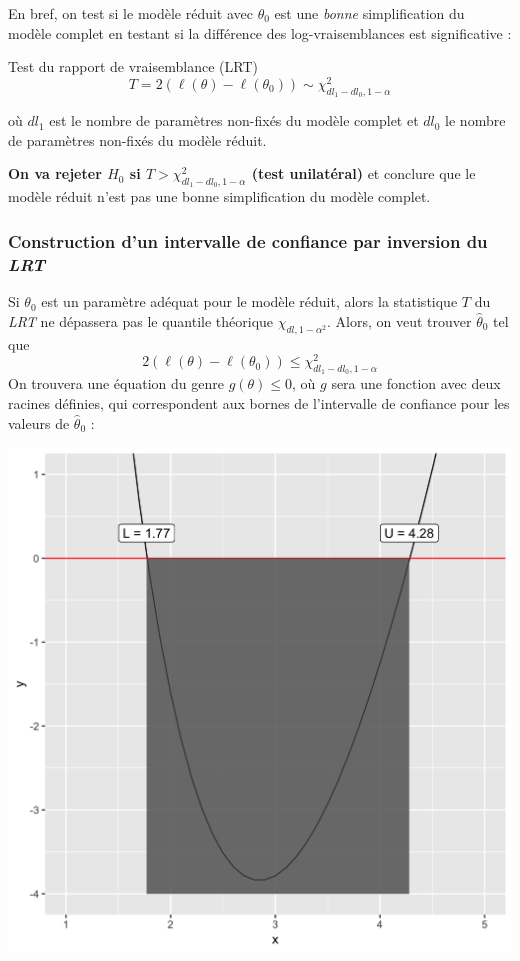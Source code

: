 \documentclass[10pt, french]{article}
\begin{document}
\begin{multicols*}{3}
En bref, on test si le modèle réduit avec $\theta_0$ est une \emph{bonne} simplification du modèle complet en testant si la différence des log-vraisemblances est significative : 
\begin{algo}{Test du rapport de vraisemblance (LRT)}
\[
	T 
	= 		2 \left( \ell(\theta) - \ell(\theta_0) \right)
	\sim		\chi_{dl_1 - dl_0, 1 - \alpha}^2
\]
\end{algo}
où $dl_1$ est le nombre de paramètres non-fixés du modèle complet et $dl_0$ le nombre de paramètres non-fixés du modèle réduit. 

\textbf{On va rejeter $H_0$ si $T >\chi_{dl_1 - dl_0, 1-\alpha}^2 $ (test unilatéral)} et conclure que le modèle réduit n'est pas une bonne simplification du modèle complet.

\subsubsection*{Construction d'un intervalle de confiance par inversion du \emph{LRT}}
Si $\theta_0$ est un paramètre adéquat pour le modèle réduit, alors la statistique $T$ du \emph{LRT} ne dépassera pas le quantile théorique $\chi_{dl, 1- \alpha^2}$. 
Alors, on veut trouver $\hat{\theta}_0$ tel que
\[2 \left( \ell(\theta) - \ell(\theta_0) \right) \leq  \chi_{dl_1 - dl_0, 1-\alpha}^2\]
On trouvera une équation du genre $g(\theta) \leq 0$, où $g$ sera une fonction avec deux racines définies, qui correspondent aux bornes de l'intervalle de confiance pour les valeurs de $\hat{\theta}_0$ : 

\begin{center}
	\includegraphics[scale = 0.07]{src/Q13-57_visualisation.png}
\end{center}


\end{multicols*}
\end{document}
